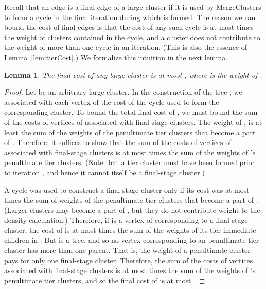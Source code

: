 \documentclass[11pt]{article}
\newtheorem{lemma}{Lemma}[section]
\begin{document}
Recall that an edge is a final edge of a large cluster  if it is
used by {\sc MergeClusters} to form a cycle  in the final iteration
during which  is formed. The reason we can bound the cost of final
edges is that the cost of any such cycle is at most  times the
weight of clusters contained in the cycle, and a cluster does not
contribute to the weight of more than one cycle in an iteration. (This
is also the essence of Lemma~\ref{lem:tierCost}.) We formalize this
intuition in the next lemma.

\begin{lemma}\label{lem:final}
  The final cost of any large cluster  is at most ,
  where  is the weight of .
\end{lemma}
\begin{proof}
  Let  be an arbitrary large cluster. In the construction of the
  tree , we associated with each vertex of  the cost of the
  cycle used to form the corresponding cluster. To bound the total
  final cost of , we must bound the sum of the costs of vertices of
   associated with final-stage clusters.  The weight of ,
   is at least the sum of the weights of the penultimate tier 
  clusters that become a part of . Therefore, it suffices to show
  that the sum of the costs of vertices of  associated with
  final-stage clusters is at most  times the sum of the
  weights of 's penultimate tier  clusters. (Note that a tier
   cluster must have been formed prior to iteration , and hence
  it cannot itself be a final-stage cluster.)

  A cycle was used to construct a final-stage cluster  only if its
  cost was at most  times the sum of weights of the
  penultimate tier  clusters that become a part of . (Larger
  clusters may become a part of , but they do not contribute weight
  to the density calculation.)  Therefore, if  is a vertex of 
  corresponding to a final-stage cluster, the cost of  is at most
   times the sum of the weights of its tier  immediate
  children in . But  is a tree, and so no vertex
  corresponding to an penultimate tier  cluster has more than one
  parent. That is, the weight of a penultimate cluster pays for only
  one final-stage cluster. Therefore, the sum of the costs of vertices
  associated with final-stage clusters is at most  times the
  sum of the weights of 's penultimate tier  clusters, and so
  the final cost of  is at most .
\end{proof}
\end{document}
